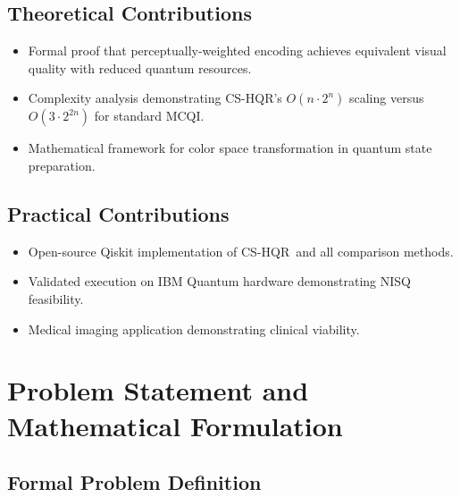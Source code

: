 \documentclass{ipol}
\newcommand{\cshqr}{\textsc{CS-HQR}}
\newcommand{\mcqi}{\textsc{MCQI}}
\begin{document}
\FloatBarrier
\subsection{Theoretical Contributions}

\begin{itemize}
  \item Formal proof that perceptually-weighted encoding achieves equivalent
    visual quality with reduced quantum resources.
  \item Complexity analysis demonstrating \cshqr's $O(n \cdot 2^n)$ scaling
    versus $O(3 \cdot 2^{2n})$ for standard \mcqi.
  \item Mathematical framework for color space transformation in quantum state
    preparation.
\end{itemize}

\FloatBarrier
\subsection{Practical Contributions}

\begin{itemize}
  \item Open-source Qiskit implementation of \cshqr\ and all comparison
    methods.
  \item Validated execution on IBM Quantum hardware demonstrating NISQ
    feasibility.
  \item Medical imaging application demonstrating clinical viability.
\end{itemize}

\FloatBarrier
\section{Problem Statement and Mathematical Formulation}
\label{sec:problem_statement}

\FloatBarrier
\subsection{Formal Problem Definition}
\end{document}
